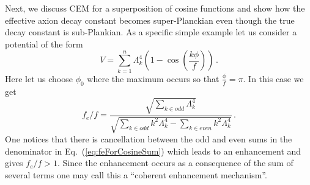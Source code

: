\documentclass[12pt]{article}
\begin{document}
Next, we discuss CEM for a superposition of cosine functions and show how the effective axion decay constant becomes super-Planckian even though the true decay constant is sub-Plankian.
As a specific simple example let us consider a potential of the form
\begin{equation} \label{eq:cosineSumPotential}
  V = \sum_{k = 1}^n \Lambda_k^4 \left(1 - \cos\left(\frac{k\phi}{f}\right)\right)\,.
\end{equation}
Here let us choose $\phi_0$ where the maximum occurs so that $\frac{\phi}{f} = \pi$.
In this case we get
\begin{equation} \label{eq:feForCosineSum}
  {f_e} / f = \frac
    {\sqrt{\sum_{k \in odd} \Lambda_k^4}}
    {\sqrt{\sum_{k \in odd} k^2 \Lambda_k^4 - \sum_{k \in even} k^2 \Lambda_k^4}}\,.
\end{equation}
One notices that there is cancellation between the odd and even sums in the denominator in Eq.~(\ref{eq:feForCosineSum}) which leads to an enhancement and gives $f_e / f > 1$.
Since the enhancement occurs as a consequence of the sum of several terms one may call this a ``coherent enhancement mechanism''.
\end{document}
